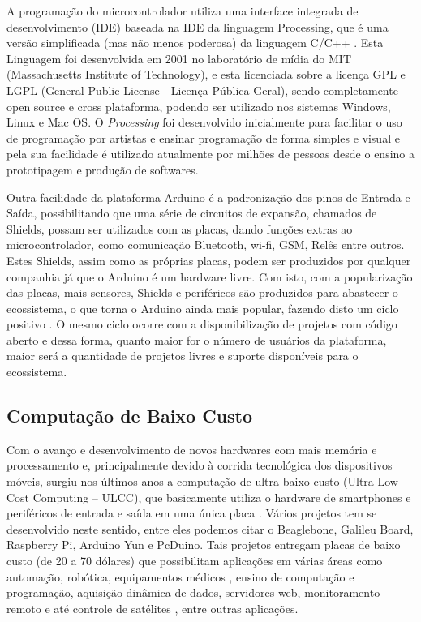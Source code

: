 A programação do microcontrolador utiliza uma interface integrada de desenvolvimento (IDE) baseada na IDE da linguagem Processing, que é uma versão simplificada (mas não menos poderosa) da linguagem C/C++ \citep{arduino-buechley}. Esta Linguagem foi desenvolvida em 2001 no laboratório de mídia do MIT (Massachusetts Institute of Technology), e esta licenciada sobre a licença GPL e LGPL (General Public License - Licença Pública Geral), sendo completamente open source e cross plataforma, podendo ser utilizado nos sistemas Windows, Linux e Mac OS. O \textit{Processing} foi desenvolvido inicialmente para facilitar o uso de programação por artistas e ensinar programação de forma simples e visual \citep{processing} e pela sua facilidade é utilizado atualmente por milhões de pessoas desde o ensino a prototipagem e produção de softwares.

Outra facilidade da plataforma Arduino é a padronização dos pinos de Entrada e Saída, possibilitando que uma série de circuitos de expansão, chamados de Shields, possam ser utilizados com as placas, dando funções extras ao microcontrolador, como comunicação Bluetooth, wi-fi, GSM, Relês entre outros. Estes Shields, assim como as próprias placas, podem ser produzidos por qualquer companhia já que o Arduino é um hardware livre. Com isto, com a popularização das placas, mais sensores, Shields e periféricos são produzidos para abastecer o ecossistema, o que torna o Arduino ainda mais popular, fazendo disto um ciclo positivo \citep{arduino-livro}. O mesmo ciclo ocorre com a disponibilização de projetos com código aberto e dessa forma, quanto maior for o número de usuários da plataforma, maior será a quantidade de projetos livres e suporte disponíveis para o ecossistema.

\subsection{Computação de Baixo Custo}

Com o avanço e desenvolvimento de novos hardwares com mais memória e processamento e, principalmente devido à corrida tecnológica dos dispositivos móveis, surgiu nos últimos anos a computação de ultra baixo custo (Ultra Low Cost Computing – ULCC), que basicamente utiliza o hardware de smartphones e periféricos de entrada e saída em uma única placa \citep{low-cost-computing}. Vários projetos tem se desenvolvido neste sentido, entre eles podemos citar o Beaglebone, Galileu Board, Raspberry Pi, Arduino Yun e PcDuino. Tais projetos entregam placas de baixo custo (de 20 a 70 dólares) que possibilitam aplicações em várias áreas como automação, robótica, equipamentos médicos \citep{raspberry-pesquisa}, ensino de computação e programação, aquisição dinâmica de dados, servidores web, monitoramento remoto e até controle de satélites \citep{raspberry-embedded}, entre outras aplicações. 

